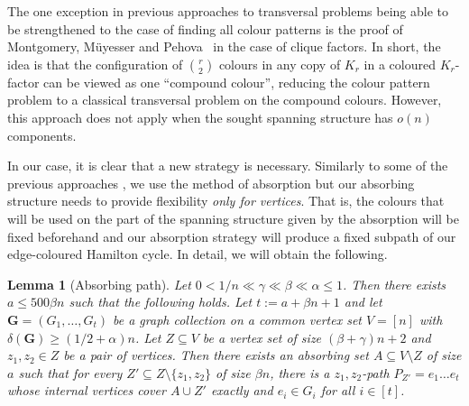 \documentclass[11pt, dvipsnames]{amsart}
\theoremstyle{plain}
\newtheorem{lemma}[theo]{Lemma}
\theoremstyle{definition}
\begin{document}
The one exception in previous approaches to transversal problems being able to be strengthened to the case of finding all colour patterns is  the proof of Montgomery, M\"uyesser and Pehova~\cite{mmp} in the  case of clique factors. In short, the idea is that the configuration of $\binom{r}{2}$ colours in any copy of $K_r$ in a coloured $K_r$-factor can be viewed as one ``compound colour'', reducing the colour pattern problem to a classical transversal problem on the compound colours.
However, this approach does not apply when the sought spanning structure has $o(n)$ components. 

In our case, it is clear that a new strategy is necessary. Similarly to some of the previous approaches \cite{CIKL,chakraborti2023hamilton,Cheng2,chwwy,Cheng1,ghmps,mmp}, we use the method of absorption but our absorbing structure needs to provide flexibility \emph{only for vertices}. That is, the colours that will be used on the part of the spanning structure given by the absorption will be fixed beforehand and our absorption strategy will produce a fixed subpath of our edge-coloured Hamilton cycle. In detail, we will obtain the following.

\begin{lemma}[Absorbing path] \label{lemma:abspath}
Let $0<1/n \ll \gamma \ll \beta \ll \alpha \leq 1$. Then there exists  $a\le 500\beta n$ such that the following holds. Let   $t:=a+\beta n+1$ and let $\mathbf{G}=(G_1, \ldots, G_t)$  be a graph collection on a common vertex set $V=[n]$ with $\delta(\mathbf{G})\geq (1/2+\alpha)n$. Let $Z \subseteq V$ be a vertex set of size $(\beta +\gamma )n+2$ and $z_1,z_2\in Z$ be a pair of vertices. Then there exists an \emph{absorbing set} $A \subseteq V \setminus Z$ of size $a$ such that for every $Z' \subseteq Z\setminus \{z_1, z_2\}$ of size $\beta n$, there is a $z_1,z_2$-path $P_{Z'}=e_1 \ldots e_t$ whose internal vertices cover $A \cup Z'$ exactly and $e_i\in G_i$ for all $i\in[t]$.
\end{lemma}
\end{document}
